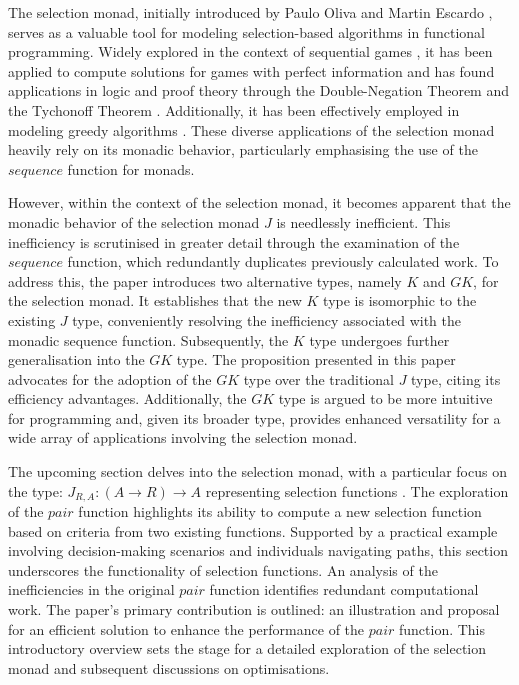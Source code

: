 \documentclass[runningheads]{llncs}
\begin{document}
The selection monad, initially introduced by Paulo Oliva and Martin
Escardo \cite{escardo2010selection}, serves as a valuable tool for
modeling selection-based algorithms in functional programming. Widely
explored in the context of sequential games
\cite{escardo2010sequential}, it has been applied to compute solutions
for games with perfect information and has found applications in logic
and proof theory through the Double-Negation Theorem and the Tychonoff
Theorem \cite{escardo2010sequential}. Additionally, it has been
effectively employed in modeling greedy algorithms
\cite{hartmann2022algorithm}. These diverse applications of the
selection monad heavily rely on its monadic behavior, particularly
emphasising the use of the \(sequence\) function for monads.

However, within the context of the selection monad, it becomes apparent
that the monadic behavior of the selection monad \(J\) is needlessly
inefficient. This inefficiency is scrutinised in greater detail through
the examination of the \(sequence\) function, which redundantly
duplicates previously calculated work. To address this, the paper
introduces two alternative types, namely \(K\) and \(GK\), for the
selection monad. It establishes that the new \(K\) type is isomorphic to
the existing \(J\) type, conveniently resolving the inefficiency
associated with the monadic sequence function. Subsequently, the \(K\)
type undergoes further generalisation into the \(GK\) type. The
proposition presented in this paper advocates for the adoption of the
\(GK\) type over the traditional \(J\) type, citing its efficiency
advantages. Additionally, the \(GK\) type is argued to be more intuitive
for programming and, given its broader type, provides enhanced
versatility for a wide array of applications involving the selection
monad.

The upcoming section delves into the selection monad, with a particular
focus on the type: \(J_{R,A}:(A \rightarrow R) \rightarrow A\)
representing selection functions \cite{escardo2010selection}. The
exploration of the \(pair\) function highlights its ability to compute a
new selection function based on criteria from two existing functions.
Supported by a practical example involving decision-making scenarios and
individuals navigating paths, this section underscores the functionality
of selection functions. An analysis of the inefficiencies in the
original \(pair\) function identifies redundant computational work. The
paper's primary contribution is outlined: an illustration and proposal
for an efficient solution to enhance the performance of the \(pair\)
function. This introductory overview sets the stage for a detailed
exploration of the selection monad and subsequent discussions on
optimisations.
\end{document}
